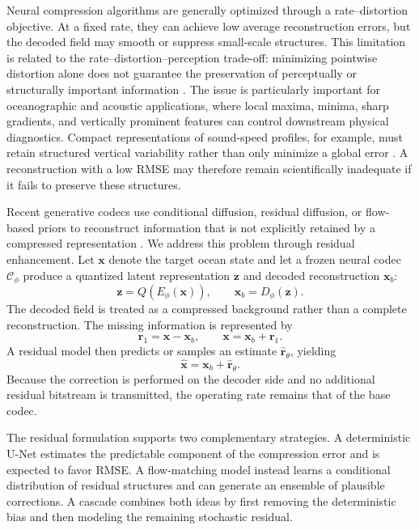 \documentclass[11pt]{article}
\newcommand{\x}{\mathbf{x}}
\newcommand{\xb}{\mathbf{x}_{b}}
\newcommand{\xh}{\widehat{\mathbf{x}}}
\newcommand{\z}{\mathbf{z}}
\newcommand{\rone}{\mathbf{r}_{1}}
\newcommand{\rh}{\widehat{\mathbf{r}}_{\theta}}
\newcommand{\Dt}{D_{\phi}}
\newcommand{\Et}{E_{\phi}}
\newcommand{\Qt}{Q}
\newcommand{\Cphi}{\mathcal{C}_{\phi}}
\begin{document}
Neural compression algorithms are generally optimized through a rate--distortion objective. At a fixed rate, they can achieve low average reconstruction errors, but the decoded field may smooth or suppress small-scale structures. This limitation is related to the rate--distortion--perception trade-off: minimizing pointwise distortion alone does not guarantee the preservation of perceptually or structurally important information \cite{blau2019rethinking,mentzer2020high}. The issue is particularly important for oceanographic and acoustic applications, where local maxima, minima, sharp gradients, and vertically prominent features can control downstream physical diagnostics. Compact representations of sound-speed profiles, for example, must retain structured vertical variability rather than only minimize a global error \cite{bianco2017dictionary}. A reconstruction with a low RMSE may therefore remain scientifically inadequate if it fails to preserve these structures.

Recent generative codecs use conditional diffusion, residual diffusion, or flow-based priors to reconstruct information that is not explicitly retained by a compressed representation \cite{ghouse2023residual,yang2023lossy,theis2022lossy,ke2025ultra,huang2026flowcodec}. We address this problem through residual enhancement. Let $\x$ denote the target ocean state and let a frozen neural codec $\Cphi$ produce a quantized latent representation $\z$ and decoded reconstruction $\xb$:
\begin{equation}
    \z = \Qt(\Et(\x)),
    \qquad
    \xb = \Dt(\z).
\end{equation}
The decoded field is treated as a compressed background rather than a complete reconstruction. The missing information is represented by
\begin{equation}
\boxed{
    \rone = \x-\xb,
    \qquad
    \x=\xb+\rone.
}
\label{eq:main_decomposition}
\end{equation}
A residual model then predicts or samples an estimate $\rh$, yielding
\begin{equation}
\boxed{
    \xh=\xb+\rh.
}
\label{eq:final_reconstruction_intro}
\end{equation}
Because the correction is performed on the decoder side and no additional residual bitstream is transmitted, the operating rate remains that of the base codec.

The residual formulation supports two complementary strategies. A deterministic U-Net estimates the predictable component of the compression error and is expected to favor RMSE. A flow-matching model instead learns a conditional distribution of residual structures and can generate an ensemble of plausible corrections. A cascade combines both ideas by first removing the deterministic bias and then modeling the remaining stochastic residual.
\end{document}

